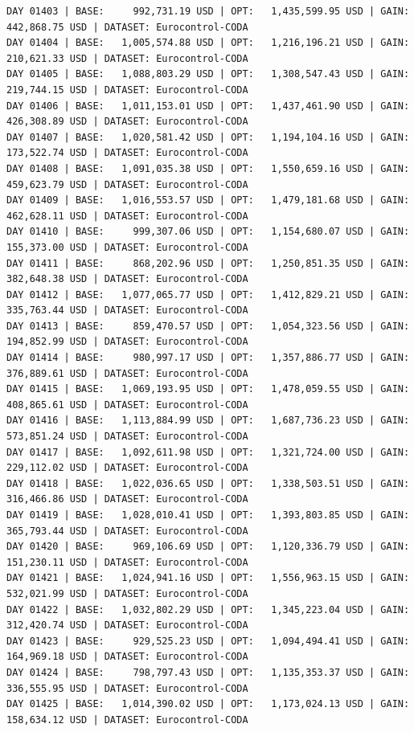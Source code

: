 \documentclass[11pt,a4paper]{article}
\begin{document}
\begin{verbatim}
DAY 01403 | BASE:     992,731.19 USD | OPT:   1,435,599.95 USD | GAIN: 442,868.75 USD | DATASET: Eurocontrol-CODA
DAY 01404 | BASE:   1,005,574.88 USD | OPT:   1,216,196.21 USD | GAIN: 210,621.33 USD | DATASET: Eurocontrol-CODA
DAY 01405 | BASE:   1,088,803.29 USD | OPT:   1,308,547.43 USD | GAIN: 219,744.15 USD | DATASET: Eurocontrol-CODA
DAY 01406 | BASE:   1,011,153.01 USD | OPT:   1,437,461.90 USD | GAIN: 426,308.89 USD | DATASET: Eurocontrol-CODA
DAY 01407 | BASE:   1,020,581.42 USD | OPT:   1,194,104.16 USD | GAIN: 173,522.74 USD | DATASET: Eurocontrol-CODA
DAY 01408 | BASE:   1,091,035.38 USD | OPT:   1,550,659.16 USD | GAIN: 459,623.79 USD | DATASET: Eurocontrol-CODA
DAY 01409 | BASE:   1,016,553.57 USD | OPT:   1,479,181.68 USD | GAIN: 462,628.11 USD | DATASET: Eurocontrol-CODA
DAY 01410 | BASE:     999,307.06 USD | OPT:   1,154,680.07 USD | GAIN: 155,373.00 USD | DATASET: Eurocontrol-CODA
DAY 01411 | BASE:     868,202.96 USD | OPT:   1,250,851.35 USD | GAIN: 382,648.38 USD | DATASET: Eurocontrol-CODA
DAY 01412 | BASE:   1,077,065.77 USD | OPT:   1,412,829.21 USD | GAIN: 335,763.44 USD | DATASET: Eurocontrol-CODA
DAY 01413 | BASE:     859,470.57 USD | OPT:   1,054,323.56 USD | GAIN: 194,852.99 USD | DATASET: Eurocontrol-CODA
DAY 01414 | BASE:     980,997.17 USD | OPT:   1,357,886.77 USD | GAIN: 376,889.61 USD | DATASET: Eurocontrol-CODA
DAY 01415 | BASE:   1,069,193.95 USD | OPT:   1,478,059.55 USD | GAIN: 408,865.61 USD | DATASET: Eurocontrol-CODA
DAY 01416 | BASE:   1,113,884.99 USD | OPT:   1,687,736.23 USD | GAIN: 573,851.24 USD | DATASET: Eurocontrol-CODA
DAY 01417 | BASE:   1,092,611.98 USD | OPT:   1,321,724.00 USD | GAIN: 229,112.02 USD | DATASET: Eurocontrol-CODA
DAY 01418 | BASE:   1,022,036.65 USD | OPT:   1,338,503.51 USD | GAIN: 316,466.86 USD | DATASET: Eurocontrol-CODA
DAY 01419 | BASE:   1,028,010.41 USD | OPT:   1,393,803.85 USD | GAIN: 365,793.44 USD | DATASET: Eurocontrol-CODA
DAY 01420 | BASE:     969,106.69 USD | OPT:   1,120,336.79 USD | GAIN: 151,230.11 USD | DATASET: Eurocontrol-CODA
DAY 01421 | BASE:   1,024,941.16 USD | OPT:   1,556,963.15 USD | GAIN: 532,021.99 USD | DATASET: Eurocontrol-CODA
DAY 01422 | BASE:   1,032,802.29 USD | OPT:   1,345,223.04 USD | GAIN: 312,420.74 USD | DATASET: Eurocontrol-CODA
DAY 01423 | BASE:     929,525.23 USD | OPT:   1,094,494.41 USD | GAIN: 164,969.18 USD | DATASET: Eurocontrol-CODA
DAY 01424 | BASE:     798,797.43 USD | OPT:   1,135,353.37 USD | GAIN: 336,555.95 USD | DATASET: Eurocontrol-CODA
DAY 01425 | BASE:   1,014,390.02 USD | OPT:   1,173,024.13 USD | GAIN: 158,634.12 USD | DATASET: Eurocontrol-CODA

\end{verbatim}
\end{document}
